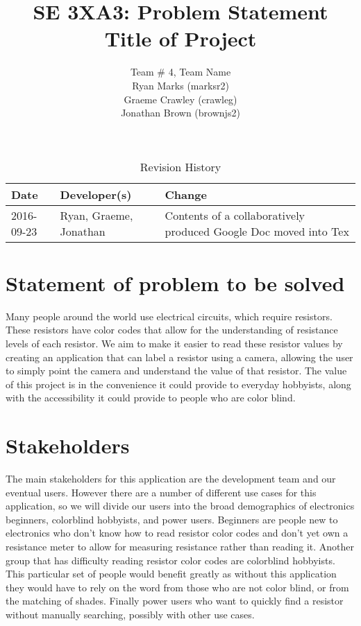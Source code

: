 \documentclass{article}
\title{SE 3XA3: Problem Statement\\Title of Project}
\author{Team \# 4, Team Name
		\\ Ryan Marks (marksr2)
		\\ Graeme Crawley (crawleg)
		\\ Jonathan Brown (brownjs2)
}
\date{}
\begin{document}
\begin{table}[hp]
\caption{Revision History} \label{TblRevisionHistory}
\begin{tabularx}{\textwidth}{llX}
\toprule
\textbf{Date} & \textbf{Developer(s)} & \textbf{Change}\\
\midrule
2016-09-23 & Ryan, Graeme, Jonathan & Contents of a collaboratively produced Google Doc moved into Tex\\
\bottomrule
\end{tabularx}
\end{table}

\newpage

\maketitle

\section{Statement of problem to be solved}

Many people around the world use electrical circuits, which require resistors.
These resistors have color codes that allow for the understanding of resistance levels of each resistor.
We aim to make it easier to read these resistor values by creating an application that can label a resistor using a camera, 
allowing the user to simply point the camera and understand the value of that resistor. 
The value of this project is in the convenience it could provide to everyday hobbyists, along with the accessibility it could provide to people who are color blind.

\section{Stakeholders}

The main stakeholders for this application are the development team and our eventual users. 
However there are a number of different use cases for this application, so we will divide our users into the broad demographics of electronics beginners, colorblind hobbyists, and power users. Beginners are people new to electronics who don’t know how to read resistor color codes and don’t yet own a resistance meter to allow for measuring resistance rather than reading it.
Another group that has difficulty reading resistor color codes are colorblind hobbyists. 
This particular set of people would benefit greatly as without this application they would have to rely on the word from those who are not color blind, or from the matching of shades. 
Finally power users who want to quickly find a resistor without manually searching, possibly with other use cases.
\end{document}
